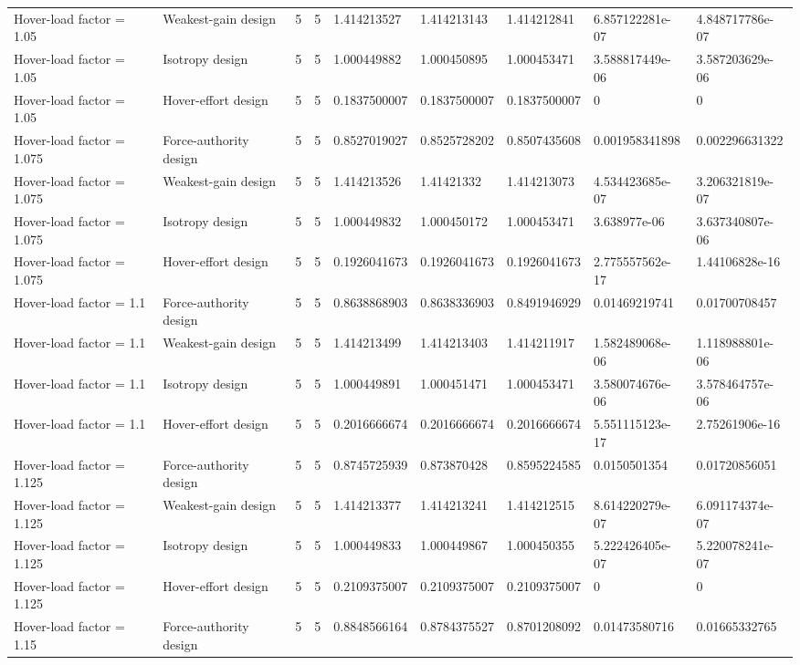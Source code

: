 \begin{tabular}{@{}lllllllll@{}}
Hover-load factor = 1.05 & Weakest-gain design & 5 & 5 & 1.414213527 & 1.414213143 & 1.414212841 & 6.857122281e-07 & 4.848717786e-07 \\
Hover-load factor = 1.05 & Isotropy design & 5 & 5 & 1.000449882 & 1.000450895 & 1.000453471 & 3.588817449e-06 & 3.587203629e-06 \\
Hover-load factor = 1.05 & Hover-effort design & 5 & 5 & 0.1837500007 & 0.1837500007 & 0.1837500007 & 0 & 0 \\
Hover-load factor = 1.075 & Force-authority design & 5 & 5 & 0.8527019027 & 0.8525728202 & 0.8507435608 & 0.001958341898 & 0.002296631322 \\
Hover-load factor = 1.075 & Weakest-gain design & 5 & 5 & 1.414213526 & 1.41421332 & 1.414213073 & 4.534423685e-07 & 3.206321819e-07 \\
Hover-load factor = 1.075 & Isotropy design & 5 & 5 & 1.000449832 & 1.000450172 & 1.000453471 & 3.638977e-06 & 3.637340807e-06 \\
Hover-load factor = 1.075 & Hover-effort design & 5 & 5 & 0.1926041673 & 0.1926041673 & 0.1926041673 & 2.775557562e-17 & 1.44106828e-16 \\
Hover-load factor = 1.1 & Force-authority design & 5 & 5 & 0.8638868903 & 0.8638336903 & 0.8491946929 & 0.01469219741 & 0.01700708457 \\
Hover-load factor = 1.1 & Weakest-gain design & 5 & 5 & 1.414213499 & 1.414213403 & 1.414211917 & 1.582489068e-06 & 1.118988801e-06 \\
Hover-load factor = 1.1 & Isotropy design & 5 & 5 & 1.000449891 & 1.000451471 & 1.000453471 & 3.580074676e-06 & 3.578464757e-06 \\
Hover-load factor = 1.1 & Hover-effort design & 5 & 5 & 0.2016666674 & 0.2016666674 & 0.2016666674 & 5.551115123e-17 & 2.75261906e-16 \\
Hover-load factor = 1.125 & Force-authority design & 5 & 5 & 0.8745725939 & 0.873870428 & 0.8595224585 & 0.0150501354 & 0.01720856051 \\
Hover-load factor = 1.125 & Weakest-gain design & 5 & 5 & 1.414213377 & 1.414213241 & 1.414212515 & 8.614220279e-07 & 6.091174374e-07 \\
Hover-load factor = 1.125 & Isotropy design & 5 & 5 & 1.000449833 & 1.000449867 & 1.000450355 & 5.222426405e-07 & 5.220078241e-07 \\
Hover-load factor = 1.125 & Hover-effort design & 5 & 5 & 0.2109375007 & 0.2109375007 & 0.2109375007 & 0 & 0 \\
Hover-load factor = 1.15 & Force-authority design & 5 & 5 & 0.8848566164 & 0.8784375527 & 0.8701208092 & 0.01473580716 & 0.01665332765 \\

\end{tabular}
